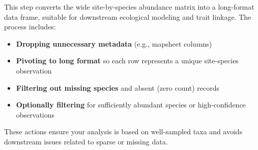 \documentclass[
]{article}
\providecommand{\tightlist}{%
  \setlength{\itemsep}{0pt}\setlength{\parskip}{0pt}}
\begin{document}
This step converts the wide site-by-species abundance matrix into a
long-format data frame, suitable for downstream ecological modeling and
trait linkage. The process includes:

\begin{itemize}
\tightlist
\item
  \textbf{Dropping unnecessary metadata} (e.g., mapsheet columns)
\item
  \textbf{Pivoting to long format} so each row represents a unique
  site-species observation
\item
  \textbf{Filtering out missing species} and absent (zero count) records
\item
  \textbf{Optionally filtering} for sufficiently abundant species or
  high-confidence observations
\end{itemize}

These actions ensure your analysis is based on well-sampled taxa and
avoids downstream issues related to sparse or missing data.
\end{document}

